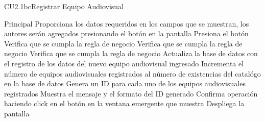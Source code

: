 \begin{UseCase}{CU2.1bc}{Registrar Equipo Audiovisual}
{\begin{itemize}
			\end{itemize}
		}
\end{UseCase}


\begin{UCtrayectoria}{Principal}
		\UCpaso[\UCactor] Proporciona los datos requeridos en los campos que se muestran, los autores serán agregados presionando el botón   en la pantalla 
		\UCpaso[\UCactor] Presiona el botón  
		\UCpaso[\UCsist] Verifica que se cumpla la regla de negocio  
		\UCpaso[\UCsist] Verifica que se cumpla la regla de negocio  
		\UCpaso[\UCsist] Verifica que se cumpla la regla de negocio  
		\UCpaso[\UCsist] Actualiza la base de datos con el registro de los datos del nuevo equipo audiovisual ingresado 
		\UCpaso[\UCsist] Incrementa el número de equipos audiovisuales registrados al número de existencias del catalógo en la base de datos
		\UCpaso[\UCsist] Genera un ID para cada uno de los equipos audiovisuales registrados
		\UCpaso[\UCsist] Muestra el mensaje  y el formato del ID generado
		\UCpaso[\UCactor] Confirma operación haciendo click en el botón  en la ventana emergente que muestra
		\UCpaso[\UCsist] Despliega la pantalla 
\end{UCtrayectoria}


